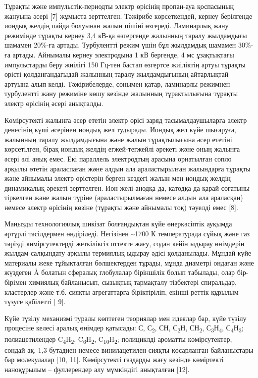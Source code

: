 Тұрақты және импульстік-периодты электр өрісінің пропан-ауа қоспасының
жануына әсері {[}7{]} жұмыста зерттелген. Тәжірибе көрсеткендей, кернеу
берілгенде иондық желдің пайда болуынан жалын пішіні өзгереді.
Ламинарлық жану режимінде тұрақты кернеу 3,4 кВ-қа өзгергенде жалынның
таралу жылдамдығы шамамен 20\%-ға артады. Турбулентті режим үшін бұл
жылдамдық шамамен 30\%-ға артады. Айнымалы кернеу электродына 1 кВ
бергенде, 4 мс ұзақтықтағы импульстарды беру жиілігі 150 Гц-тен бастап
өзгертсе жиіліктің артуы тұрақты өрісті қолданғандағыдай жалынның таралу
жылдамдығының айтарлықтай артуына алып келді. Тәжірибелерде, сонымен
қатар, ламинарлы режимнен турбулентті жану режиміне көшу кезінде
жалынның тұрақтылығына тұрақты электр өрісінің әсері анықталды.

Көмірсутекті жалынға әсер ететін электр өрісі заряд тасымалдаушыларға
электр денесінің күші әсерінен иондық жел тудырады. Иондық жел күйе
шығаруға, жалынның таралу жылдамдығына және жалын тұрақтылығына әсер
ететіні көрсетілген, бірақ иондық желдің егжей-тегжейлі әрекеті және
оның жалынға әсері әлі анық емес. Екі параллель электродтың арасына
орнатылған сопло арқылы өтетін араласпаған және алдын ала араластырылған
жалындарға тұрақты және айнымалы электр өрістерін берген кездегі жалын
мен иондық желдің динамикалық әрекеті зерттелген. Ион желі анодқа да,
катодқа да қарай соғатыны тіркелген және жалын түріне (араластырылмаған
немесе алдын ала араласқан) немесе электр өрісінің көзіне (тұрақты және
айнымалы тоқ) тәуелді емес {[}8{]}.

Маңызды технологиялық шикізат болғандықтан күйе өнеркәсіптік ауқымда
әртүрлі тәсілдермен өндіріледі. Негізінен \textasciitilde1700 К
температурада сұйық және газ тәрізді көмірсутектерді жеткіліксіз оттекте
жағу, содан кейін ыдырау өнімдерін жылдам салқындату арқылы термиялық
ыдырау әдісі қолданылады. Мұндай күйе материалы жеке тұйықталған
бөлшектерден тұрады, мұнда диаметрі ондаған және жүздеген Å болатын
сфералық глобулалар біріншілік болып табылады, олар бір-бірімен химиялық
байланысып, сызықтық тармақталу тізбектері спиральдар, кластерлер және
т.б. сияқты агрегаттарға біріктіріліп, екінші реттік құрылым түзуге
қабілетті {[} 9{]}.

Күйе түзілу механизмі туралы көптеген теориялар мен идеялар бар, күйе
түзілу процесіне келесі аралық өнімдер қатысады: С, С\textsubscript{2},
СН, С\textsubscript{2}Н, СН\textsubscript{2},
С\textsubscript{3}Н\textsubscript{4},
С\textsubscript{4}Н\textsubscript{3}; полиацетилендер
C\textsubscript{4}H\textsubscript{2},
C\textsubscript{6}H\textsubscript{2},
C\textsubscript{10}H\textsubscript{2}; полициклді ароматты
көмірсутектер, сондай-ақ, 1,3-бутадиен немесе винилацетилен сияқты
қосарланған байланыстары бар молекулалар {[}10, 11{]}. Көмірсутекті
газдарды жағу кезінде көміртекті наноқұрылым -- фуллерендер алу
мүмкіндігі анықталған {[}12{]}.

